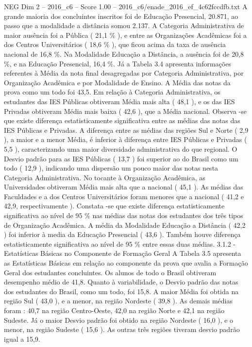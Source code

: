 \begin{textsample}{NEG Dim 2 – 2016\_c6 – Score 1.00 – 2016\_c6/enade\_2016\_ef\_4c62fccdfb.txt}
A grande maioria dos concluintes inscritos foi de Educação Presencial, 20.871, ao passo que a modalidade a distância somou 2.137.
A Categoria Administrativa de maior ausência foi a Pública ( 21,1 \% ), e entre as Organizações Acadêmicas foi a dos Centros Universitários ( 18,6 \% ), que ficou acima da taxa de ausência nacional de 16,8 \%.
Na Modalidade Educação a Distância, a ausência foi de 20,8 \%, e na Educação Presencial, 16,4 \%.
Já a Tabela 3.4 apresenta informações referentes à Média da nota final desagregadas por Categoria Administrativa, por Organização Acadêmica e por Modalidade de Ensino.
A Média das notas da prova como um todo foi 43,5.
Em relação à Categoria Administrativa, os estudantes das IES Públicas obtiveram Média mais alta ( 48,1 ), e os das IES Privadas obtiveram Média mais baixa ( 42,6 ), que a Média nacional.
Observa -se que existe diferença estatisticamente significativa entre as médias das notas das IES Públicas e Privadas.
A diferença entre as médias das regiões Sul e Norte ( 2,9 ), a maior e a menor Média, é inferior à diferença entre IES Públicas e Privadas ( 5,5 ), caracterizando uma maior diversidade administrativa do que regional.
O Desvio padrão para as IES Públicas ( 13,7 ) foi superior ao do Brasil como um todo ( 12,9 ), indicando uma dispersão um pouco maior das notas nesta Categoria Administrativa.
No tocante à Organização Acadêmica, as Universidades obtiveram Média mais alta que a nacional ( 45,1 ).
As médias das Faculdades e a dos Centros Universitários foram menores que a nacional ( 41,2 e 42,9, respectivamente ).
Constata -se que existe diferença estatisticamente significativa ao nível de 95 \% nas médias das notas dos estudantes dos três tipos de Organização Acadêmica.
A média da Modalidade Educação a Distância ( 42,2 ) foi inferior à media da Educação Presencial ( 43,6 ).
Também houve diferença estatisticamente significativa ao nível de 95 \% entre essas duas médias. 3.1.2 - Estatísticas Básicas no Componente de Formação Geral A Tabela 3.5 apresenta as Estatísticas Básicas em relação ao componente da prova que avalia a Formação Geral dos estudantes concluintes.
Os alunos de todo o Brasil obtiveram desempenho médio de 41,8.
Quanto à variabilidade, o Desvio padrão das notas dos estudantes do Brasil, como um todo, foi 15,8.
A maior Média foi obtida na região Sul ( 43,0 ), e a menor, na região Nordeste ( 39,8 ).
As demais médias foram : 40,7 na região Centro-Oeste, 42,0 na região Norte e 42,1 na região Sudeste.
Já o maior Desvio padrão foi obtido na região Nordeste ( 16,0 ), e o menor, na região Sudeste ( 15,6 ).
As outras três regiões tiveram desvio padrão igual a 15,9.

\end{textsample}

